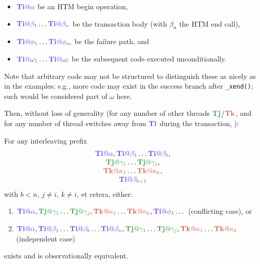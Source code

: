 \newcommand\tii{\ensuremath{\hilight{lavender}{\mathbf{Ti}}}\xspace}
\newcommand\tjj{\ensuremath{\hilight{seafoam}{\mathbf{Tj}}}\xspace}
\newcommand\tkk{\ensuremath{\hilight{salmon}{\mathbf{Tk}}}\xspace}

\newcommand\tiiat[1]{\ensuremath{\hilight{lavender}{\mathbf{Ti}@#1}}\xspace}
\newcommand\tjjat[1]{\ensuremath{\hilight{seafoam} {\mathbf{Tj}@#1}}\xspace}
\newcommand\tkkat[1]{\ensuremath{\hilight{salmon}  {\mathbf{Tk}@#1}}\xspace}

\begin{itemize}
	\item $\tiiat{\alpha}$ be an HTM begin operation,
	\item $\tiiat{\beta_1}\dots\tiiat{\beta_n}$ be the transaction body (with $\beta_n$ the HTM end call),
	\item $\tiiat{\phi_1}\dots\tiiat{\phi_m}$ be the failure path, and
	\item $\tiiat{\omega_1}\dots\tiiat{\omega_l}$ be the subsequent code executed unconditionally.
\end{itemize}
Note that arbitrary code may not be structured to distinguish these as nicely as in the examples;
e.g., more code may exist in the success branch after {\tt \_xend()};
such would be considered part of $\omega$ here.

Then, without loss of generality (for any number of other threads \tjj/\tkk,
and for any number of thread switches away from \tii during the transaction,
):
\vspace{1em}

\begin{lemma}
	\label{lem:equiv}
	For any interleaving prefix
	\[
	\begin{tabular}{c}
		$\tiiat{\alpha},\tiiat{\beta_1}\dots\tiiat{\beta_b},$\\
		$\tjjat{\gamma_1}\dots\tjjat{\gamma_j},$ \\
		$\tkkat{\kappa_1}\dots\tkkat{\kappa_k},$ \\
		$\tiiat{\beta_{b+1}}$ %
	\end{tabular}
	\]
	with $b<n$, $j \ne i$, $k \ne i$, et cetera, either:
	\begin{enumerate}
		\item $\tiiat{\alpha},\tjjat{\gamma_1}\dots\tjjat{\gamma_j},\tkkat{\kappa_1}\dots\tkkat{\kappa_k},\tiiat{\phi_1}\dots$
			(conflicting case), or
		\item $\tiiat{\alpha},\tiiat{\beta_1}\dots\tiiat{\beta_b}\dots\tiiat{\beta_n},\tjjat{\gamma_1}\dots\tjjat{\gamma_j},\tkkat{\kappa_1}\dots\tkkat{\kappa_k}$
			(independent case)
	\end{enumerate}
	exists and is observationally equivalent.
\end{lemma}

